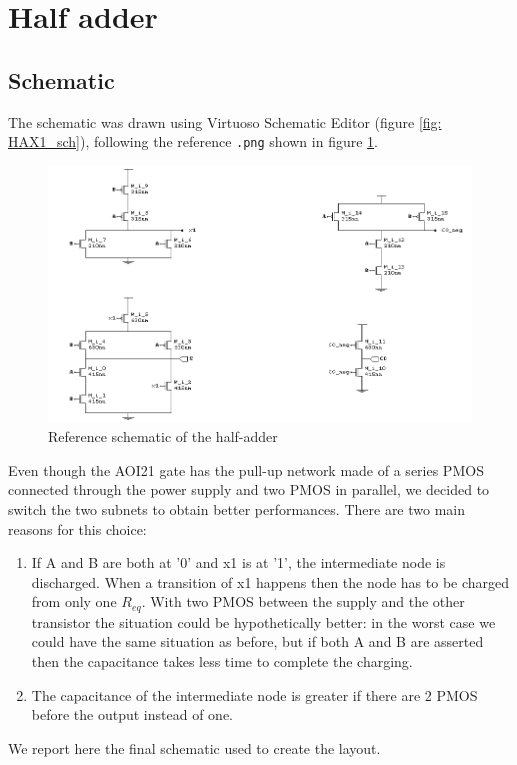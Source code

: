\documentclass[a4paper]{article}
\begin{document}
\newpage
\section{Half adder}
\subsection{Schematic}
The schematic was drawn using Virtuoso Schematic Editor (figure \ref{fig: HAX1_sch}), following the reference \texttt{.png} shown in figure \ref{fig: HAX1_png}.

\begin{figure}[H]
	\includegraphics[width=0.9\linewidth]{./Images/HA/HA_X1.png}
	\caption{Reference schematic of the half-adder}
	\label{fig: HAX1_png}
\end{figure}

Even though the AOI21 gate has the pull-up network made of a series PMOS connected through the power supply and two PMOS in parallel, we decided to switch the two subnets to obtain better performances. There are two main reasons for this choice:
\begin{enumerate}
\item If A and B are both at '0' and x1 is at '1', the intermediate node is discharged. When a transition of x1 happens then the node has to be charged from only one $R_{eq}$. With two PMOS between the supply and the other transistor the situation could be hypothetically better: in the worst case we could have the same situation as before, but if both A and B are asserted then the capacitance takes less time to complete the charging.
\item The capacitance of the intermediate node is greater if there are 2 PMOS before the output instead of one.
\end{enumerate}

We report here the final schematic used to create the layout.
\end{document}
